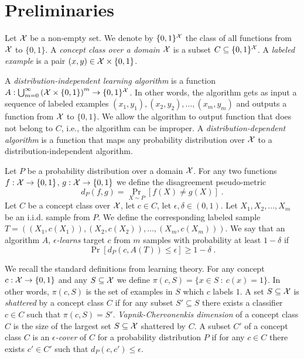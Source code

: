 \section{Preliminaries}
\label{section:preliminaries}

Let $\mathcal{X}$ be a non-empty set. We denote by $\{0,1\}^{\mathcal{X}}$ the class of all
functions from $\mathcal{X}$ to $\{0,1\}$. A \emph{concept class over a domain $\mathcal{X}$} is a
subset $C \subseteq \{0,1\}^{\mathcal{X}}$. A \emph{labeled example} is a pair $(x,y) \in
\mathcal{X} \times \{0,1\}$.

A \emph{distribution-independent learning algorithm} is a function
$A:\bigcup_{m=0}^\infty \left(\mathcal{X} \times \{0,1\} \right)^m \to \{0,1\}^{\mathcal{X}}$. In
other words, the algorithm gets as input a sequence of labeled examples $(x_1,
y_1), (x_2, y_2), \dots, (x_m, y_m)$ and outputs a function from $\mathcal{X}$ to
$\{0,1\}$. We allow the algorithm to output function that does not belong to
$C$, i.e., the algorithm can be improper. A \emph{distribution-dependent
algorithm} is a function that maps any probability distribution over $\mathcal{X}$ to a
distribution-independent algorithm.

Let $P$ be a probability distribution over a domain $\mathcal{X}$. For any two functions
$f:\mathcal{X} \to \{0,1\}$, $g:\mathcal{X} \to \{0,1\}$ we define the disagreement pseudo-metric
$$
d_P(f,g) = \Pr_{X \sim P}[f(X) \neq g(X)] \; .
$$
Let $C$ be a concept class over $\mathcal{X}$, let $c \in C$, let $\epsilon, \delta \in (0,1)$.
Let  $X_1, X_2, \dots, X_m$ be an i.i.d. sample from $P$. We define the corresponding
labeled sample $T = ((X_1, c(X_1)), (X_2, c(X_2)), \dots, (X_m, c(X_m)))$.
We say that an algorithm $A$, \emph{$\epsilon$-learns} target $c$ from $m$ samples
with probability at least $1 - \delta$ if
$$
\Pr \left[d_P(c,A(T)) \le \epsilon \right]  \ge 1 - \delta \; .
$$

We recall the standard definitions from learning theory. For any concept $c:\mathcal{X}
\to \{0,1\}$ and any $S \subseteq \mathcal{X}$ we define $\pi(c,S) = \{x \in S ~:~ c(x) =
1 \}$. In other words, $\pi(c,S)$ is the set of examples in $S$ which $c$ labels
$1$. A set $S \subseteq \mathcal{X}$ is \emph{shattered} by a concept class $C$ if for
any subset $S' \subseteq S$ there exists a classifier $c \in C$ such that
$\pi(c,S) = S'$. \emph{Vapnik-Chervonenkis dimension} of a concept class $C$ is
the size of the largest set $S \subseteq \mathcal{X}$ shattered by $C$. A subset $C'$ of
a concept class $C$ is an \emph{$\epsilon$-cover} of $C$ for a probability
distribution $P$ if for any $c \in C$ there exists $c' \in C'$ such that
$d_P(c,c') \le \epsilon$.

